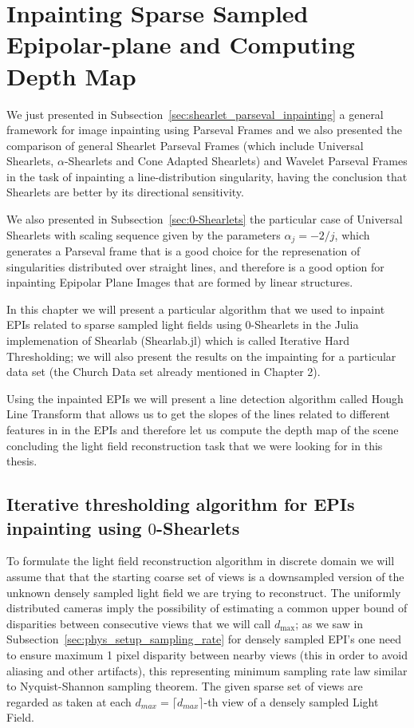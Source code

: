 \chapter{Inpainting Sparse Sampled Epipolar-plane and Computing Depth Map}
\label{chap:Inpainting_sparse}

We just presented in Subsection~\ref{sec:shearlet_parseval_inpainting} a general framework for image inpainting using Parseval Frames and we also presented the comparison of general Shearlet Parseval Frames (which include Universal Shearlets, $\alpha$-Shearlets and Cone Adapted Shearlets) and Wavelet Parseval Frames in the task of inpainting a line-distribution singularity, having the conclusion that Shearlets are better by its directional sensitivity.

\bigskip

We also presented in Subsection~\ref{sec:0-Shearlets} the particular case of Universal Shearlets with scaling sequence given by the parameters $\alpha_j=-2/j$, which generates a Parseval frame that is a good choice for the represenation of singularities distributed over straight lines, and therefore is a good option for inpainting Epipolar Plane Images that are formed by linear structures.

\bigskip

In this chapter we will present a particular algorithm that we used to inpaint EPIs related to sparse sampled light fields using $0$-Shearlets in the Julia implemenation of Shearlab (Shearlab.jl) which is called Iterative Hard Thresholding; we will also present the results on the impainting for a particular data set (the Church Data set already mentioned in Chapter 2). 

\bigskip

Using the inpainted EPIs we will present a line detection algorithm called Hough Line Transform that allows us to get the slopes of the lines related to different features in in the EPIs and therefore let us compute the depth map of the scene concluding the light field reconstruction task that we were looking for in this thesis. 

\section{Iterative thresholding algorithm for EPIs inpainting using $0$-Shearlets}

To formulate the light field reconstruction algorithm in discrete domain we will assume that that the starting coarse set of views is a downsampled version of the unknown densely sampled light field we are trying to reconstruct. The uniformly distributed cameras imply the possibility of estimating a common upper bound of disparities between consecutive views that we will call $d_{\text{max}}$; as we saw in Subsection~\ref{sec:phys_setup_sampling_rate} for densely sampled EPI's one need to ensure maximum 1 pixel disparity between nearby views (this in order to avoid aliasing and other artifacts), this representing minimum sampling rate law similar to Nyquist-Shannon sampling theorem. The given sparse set of views are regarded as taken at each $d_{max}=\lceil d_{max}\rceil$-th view of a densely sampled Light Field. 

